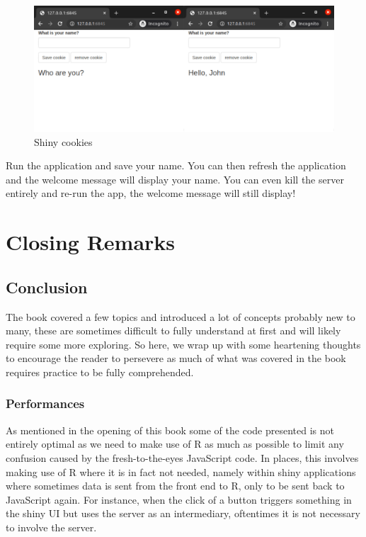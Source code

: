 \documentclass[
]{krantz}
\begin{document}
\begin{figure}
\centering
\includegraphics{images/shiny-cookies-2.png}
\caption{Shiny cookies}
\end{figure}

Run the application and save your name. You can then refresh the application and the welcome message will display your name. You can even kill the server entirely and re-run the app, the welcome message will still display!

\hypertarget{part-closing-remarks}{%
\part{Closing Remarks}\label{part-closing-remarks}}

\hypertarget{conclusion}{%
\chapter{Conclusion}\label{conclusion}}

The book covered a few topics and introduced a lot of concepts probably new to many, these are sometimes difficult to fully understand at first and will likely require some more exploring. So here, we wrap up with some heartening thoughts to encourage the reader to persevere as much of what was covered in the book requires practice to be fully comprehended.

\hypertarget{performances}{%
\section{Performances}\label{performances}}

As mentioned in the opening of this book some of the code presented is not entirely optimal as we need to make use of R as much as possible to limit any confusion caused by the fresh-to-the-eyes JavaScript code. In places, this involves making use of R where it is in fact not needed, namely within shiny applications where sometimes data is sent from the front end to R, only to be sent back to JavaScript again. For instance, when the click of a button triggers something in the shiny UI but uses the server as an intermediary, oftentimes it is not necessary to involve the server.
\end{document}
